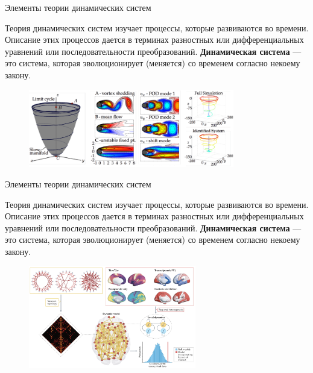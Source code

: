 
\usepackage{tikz}
\usepackage{amsmath}
\usepackage[english,russian]{babel}
\usepackage[labelformat=empty]{caption}

\usepackage{graphicx,animate}
\usepackage{animate}

\usetikzlibrary{arrows,shapes,positioning,shadows,trees}
\newcommand*{\defeq}{\stackrel{\text{def}}{=}}


\begin{frame}[plain]
\titlepage
\end{frame}

\begin{frame}{Элементы теории динамических систем}

Теория динамических систем изучает процессы, которые развиваются во времени. 
Описание этих процессов дается в терминах разностных или дифференциальных
уравнений или последовательности преобразований.
\newline{}
\textbf{Динамическая система} --- это система, которая эволюционирует (меняется) со временем согласно некоему закону.
\begin{figure}
    \centering
    \includegraphics[width=0.8\textwidth]{lecture_5/figs/example-1.png}
\end{figure}

\end{frame}
\begin{frame}{Элементы теории динамических систем}

Теория динамических систем изучает процессы, которые развиваются во времени. 
Описание этих процессов дается в терминах разностных или дифференциальных
уравнений или последовательности преобразований.
\newline{}
\textbf{Динамическая система} --- это система, которая эволюционирует (меняется) со временем согласно некоему закону.
\begin{figure}
    \centering
    \includegraphics[width=0.65\textwidth]{lecture_5/figs/example-2.png}
\end{figure}

\end{frame}
